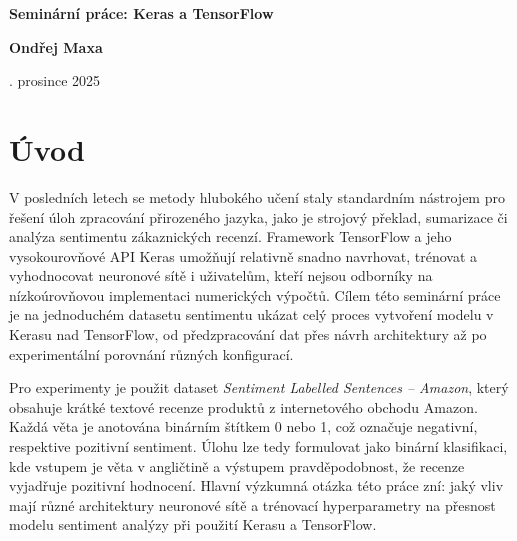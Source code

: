 \documentclass[a4paper,oneside,11pt,usenames,dvipsnames]{article}
\begin{document}
\thispagestyle{empty}
\begin {center}
	\vspace *{10mm}
	{\Huge \sffamily \bfseries Seminární práce: Keras a TensorFlow}

	\vspace *{20mm}
	{\Large \sffamily \bfseries Ondřej Maxa}

	\vspace *{7.5mm}
	{\large {}. prosince 2025}
\end {center}

\begin{abstract}
	Tato seminární práce se zabývá využitím frameworků TensorFlow a Keras pro úlohu binární analýzy sentimentu krátkých produktových recenzí z datasetu Sentiment Labelled Sentences -- Amazon \cite{uci_sls}. Cílem práce je ukázat kompletní postup od předzpracování textu přes návrh architektury neuronové sítě až po experimentální vyhodnocení různých konfigurací modelu. Pro reprezentaci textu je použita vrstva \texttt{TextVectorization} a embedding, nad nimiž jsou testovány jak jednoduché husté modely, tak konvoluční architektura s vrstvou \texttt{Conv1D}. Výsledky ukazují, že vhodně navržený konvoluční model dosahuje validační přesnosti přibližně 80\,\% a překonává jednodušší konfigurace z hlediska generalizace na validační množinu.
\end{abstract}

\setlength{\parskip}{1ex plus 0.25ex minus 0.125ex}
  
\section{Úvod}
\label{sec:uvod}
V posledních letech se metody hlubokého učení staly standardním nástrojem pro řešení úloh zpracování přirozeného jazyka, jako je strojový překlad, sumarizace či analýza sentimentu zákaznických recenzí. Framework TensorFlow a jeho vysokourovňové API Keras umožňují relativně snadno navrhovat, trénovat a vyhodnocovat neuronové sítě i uživatelům, kteří nejsou odborníky na nízkoúrovňovou implementaci numerických výpočtů. Cílem této seminární práce je na jednoduchém datasetu sentimentu ukázat celý proces vytvoření modelu v Kerasu nad TensorFlow, od předzpracování dat přes návrh architektury až po experimentální porovnání různých konfigurací.

Pro experimenty je použit dataset \emph{Sentiment Labelled Sentences -- Amazon}, který obsahuje krátké textové recenze produktů z internetového obchodu Amazon. Každá věta je anotována binárním štítkem 0 nebo 1, což označuje negativní, respektive pozitivní sentiment. Úlohu lze tedy formulovat jako binární klasifikaci, kde vstupem je věta v angličtině a výstupem pravděpodobnost, že recenze vyjadřuje pozitivní hodnocení. Hlavní výzkumná otázka této práce zní: jaký vliv mají různé architektury neuronové sítě a trénovací hyperparametry na přesnost modelu sentiment analýzy při použití Kerasu a TensorFlow.
 
\end{document}
